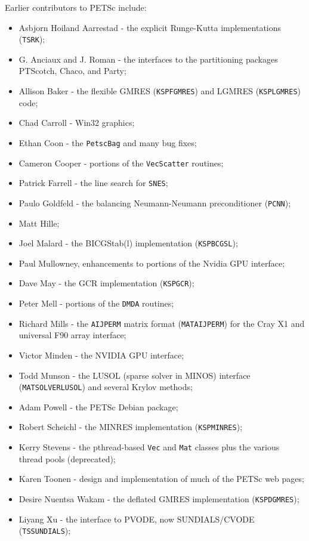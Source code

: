 \noindent 
Earlier contributors to PETSc include:
\begin{itemize}
  \item Asbjorn Hoiland Aarrestad - the explicit Runge-Kutta implementations (\lstinline{TSRK});
  \item G. Anciaux and J. Roman - the interfaces to the partitioning packages PTScotch, Chaco, and Party;
  \item Allison Baker - the flexible GMRES (\lstinline{KSPFGMRES}) and LGMRES (\lstinline{KSPLGMRES}) code;
  \item Chad Carroll - Win32 graphics;
  \item Ethan Coon - the \lstinline{PetscBag} and many bug fixes;
  \item Cameron Cooper - portions of the \lstinline{VecScatter} routines;
  \item Patrick Farrell - the  line search for \lstinline{SNES};
  \item Paulo Goldfeld - the balancing Neumann-Neumann preconditioner (\lstinline{PCNN});
  \item Matt Hille;
  \item Joel Malard - the BICGStab(l) implementation (\lstinline{KSPBCGSL});
  \item Paul Mullowney, enhancements to portions of the Nvidia GPU interface;
  \item Dave May - the GCR implementation (\lstinline{KSPGCR});
  \item Peter Mell - portions of the \lstinline{DMDA} routines;
  \item Richard Mills - the \lstinline{AIJPERM} matrix format (\lstinline{MATAIJPERM}) for the Cray X1 and universal F90 array interface;
  \item Victor Minden - the NVIDIA GPU interface;
  \item Todd Munson - the LUSOL (sparse solver in MINOS) interface (\lstinline{MATSOLVERLUSOL}) and several Krylov methods;
  \item Adam Powell - the PETSc Debian package;
  \item Robert Scheichl - the MINRES implementation (\lstinline{KSPMINRES});
  \item Kerry Stevens - the pthread-based \lstinline{Vec} and \lstinline{Mat} classes plus the various thread pools (deprecated);
  \item Karen Toonen - design and implementation of much of the PETSc web pages;
  \item Desire Nuentsa Wakam - the deflated GMRES implementation (\lstinline{KSPDGMRES});
  \item Liyang Xu - the interface to PVODE, now SUNDIALS/CVODE (\lstinline{TSSUNDIALS});
\end{itemize}


